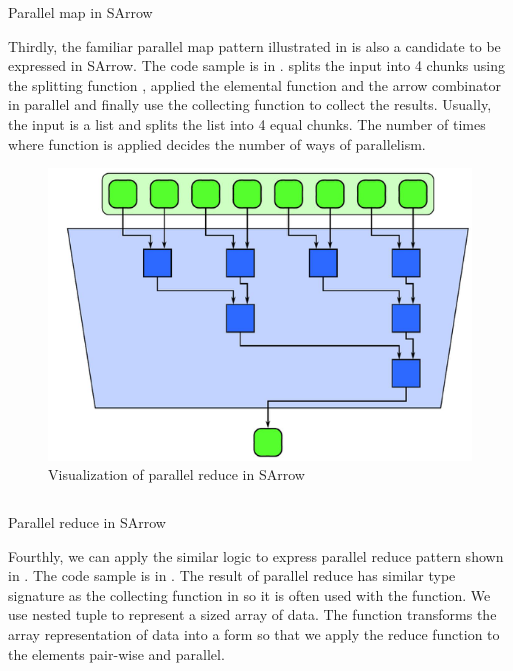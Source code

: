 \begin{listing}[ht]
    \inputminted{Haskell}{arrow/pmap.hs}
    \caption{Parallel map in SArrow}
    \label{arrow:code:pmap}
\end{listing}
Thirdly, the familiar parallel map pattern illustrated in  is also a candidate to be expressed in SArrow. The code sample is in .  splits the input  into 4 chunks using the splitting function , applied the elemental function  and the arrow combinator \hask{***} in parallel and finally use the collecting function  to collect the results. Usually, the input  is a list and  splits the list into 4 equal chunks. The number of times where function is  applied decides the number of ways of parallelism. %

\begin{figure}[ht]
    \centering 
    \includegraphics{arrow/preduc.png}
    \caption{Visualization of parallel reduce in SArrow \cite{mccoolStructuredParallelPrograming2012}}
    \label{arrow:fig:preduc}
\end{figure}
\begin{listing}[ht]
    \inputminted{Haskell}{arrow/preduc.hs} 
    \caption{Parallel reduce in SArrow}
    \label{arrow:code:preduc}
\end{listing}
Fourthly, we can apply the similar logic to express parallel reduce pattern shown in . The code sample is in . The result of parallel reduce has similar type signature as the collecting function in  so it is often used with the  function. We use nested tuple  to represent a sized array of data. The  function transforms the array representation of data into a form so that we apply the reduce function  to the elements pair-wise and parallel.

